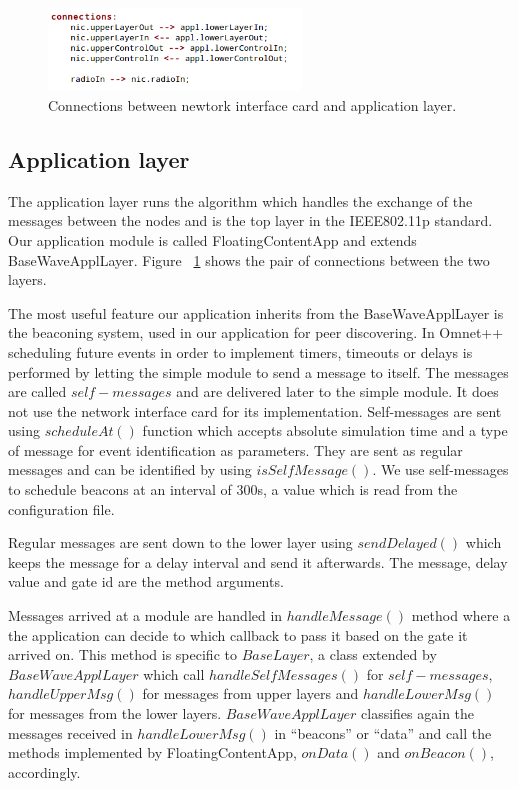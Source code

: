 \begin{figure}[t]
	\centering
	\includegraphics[width=0.6\textwidth]{img/appl_connections}
	\caption{Connections between newtork interface card and application
	layer.}
	\label{fig:appl_connections}
\end{figure}

\subsection{Application layer}

The application layer runs the algorithm which handles the exchange of the
messages between the nodes and is the top layer in the IEEE802.11p standard. Our
application module is called FloatingContentApp and extends BaseWaveApplLayer.
Figure ~\ref{fig:appl_connections} shows the pair of connections between the two
layers.

The most useful feature our application inherits from the BaseWaveApplLayer is
the beaconing system, used in our application for peer discovering. In Omnet++
scheduling future events in order to implement timers, timeouts or delays is
performed by letting the simple module to send a message to itself. The messages
are called $self-messages$ and are delivered later to the simple module. It does
not use the network interface card for its implementation. Self-messages are
sent using $scheduleAt()$ function which accepts absolute simulation time and a
type of message for event identification as parameters. They are sent as regular
messages and can be identified by using $isSelfMessage()$. We use self-messages
to schedule beacons at an interval of 300s, a value which is read from the
configuration file.

Regular messages are sent down to the lower layer using $sendDelayed()$ which
keeps the message for a delay interval and send it afterwards. The message,
delay value and gate id are the method arguments.

Messages arrived at a module are handled in $handleMessage()$ method where a the
application can decide to which callback to pass it based on the gate it arrived
on. This method is specific to $BaseLayer$, a class extended by
$BaseWaveApplLayer$ which call $handleSelfMessages()$ for $self-messages$,
$handleUpperMsg()$ for messages from upper layers and $handleLowerMsg()$ for
messages from the lower layers. $BaseWaveApplLayer$ classifies again the
messages received in $handleLowerMsg()$ in ``beacons'' or ``data'' and call the
methods implemented by FloatingContentApp, $onData()$ and $onBeacon()$, accordingly.

